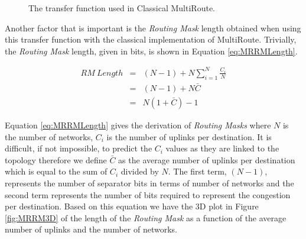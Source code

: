 \begin{figure}[htbp!]
\begin{center}


\end{center}
\caption{The transfer function used in Classical MultiRoute.}
\label{fig:MRTF}
\end{figure}

Another factor that is important is the \textit{Routing Mask} length obtained
when using this transfer function with the classical implementation of
MultiRoute. Trivially, the \textit{Routing Mask} length, given in bits, is shown
in Equation \ref{eq:MRRMLength}. 

\begin{eqnarray}
 RM~Length &=& (N-1) + N\displaystyle\sum\limits_{i=1}^N \frac{C_{i}}{N} \nonumber \\
&=& (N - 1) + N\bar{C} \nonumber \\ 
&=& N(1 + \bar{C}) - 1
\label{eq:MRRMLength}
\end{eqnarray}

Equation \ref{eq:MRRMLength} gives the derivation of \textit{Routing Masks}
where $N$ is the number of networks, $C_{i}$ is the number of uplinks per
destination. It is difficult, if not impossible, to predict the $C_i$ values as
they are linked to the topology therefore we define $\bar{C}$ as the average
number of uplinks per destination which is equal to the sum of $C_{i}$ divided
by $N$. The first term, $(N-1)$, represents the number of separator bits in
terms of number of networks and the second term represents the number of bits
required to represent the congestion per destination. Based on this equation we
have the 3D plot in Figure \ref{fig:MRRM3D} of the length of the \textit{Routing
Mask} as a function of the average number of uplinks and the number of networks.

